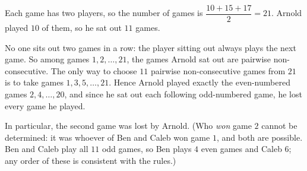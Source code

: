 Each game has two players, so the number of games is $\dfrac{10+15+17}{2}=21$. Arnold played $10$ of them, so he sat out $11$ games.

No one sits out two games in a row: the player sitting out always plays the next game. So among games $1,2,\dots,21$, the games Arnold sat out are pairwise non-consecutive. The only way to choose $11$ pairwise non-consecutive games from $21$ is to take games $1,3,5,\dots,21$. Hence Arnold played exactly the even-numbered games $2,4,\dots,20$, and since he sat out each following odd-numbered game, he lost every game he played.

In particular, the second game was lost by $\boxed{\text{Arnold}}$. (Who \emph{won} game $2$ cannot be determined: it was whoever of Ben and Caleb won game $1$, and both are possible. Ben and Caleb play all $11$ odd games, so Ben plays $4$ even games and Caleb $6$; any order of these is consistent with the rules.)
